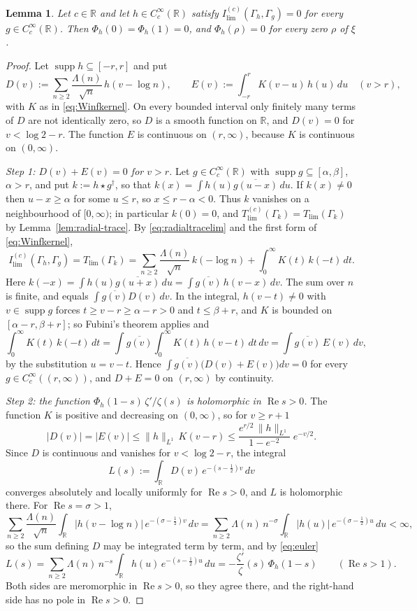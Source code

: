 \documentclass[11pt]{amsart}
\newtheorem{lemma}[theorem]{Lemma}
\theoremstyle{remark}
\numberwithin{equation}{section}
\newcommand{\R}{\mathbb R}
\newcommand{\Rel}{\operatorname{Re}}
\newcommand{\supp}{\operatorname{supp}}
\newcommand{\Tl}{T_{\lim}}
\begin{document}
\begin{lemma}
\label{lem:radicalnec}
Let $c\in\R$ and let $h\in C_c^\infty(\R)$ satisfy
$I^{(c)}_{\lim}(\Gamma_h,\Gamma_g)=0$ for every $g\in C_c^\infty(\R)$.  Then
$\Phi_h(0)=\Phi_h(1)=0$, and $\Phi_h(\rho)=0$ for every zero $\rho$ of $\xi$.
\end{lemma}

\begin{proof}
Let $\supp h\subseteq[-r,r]$ and put
\[
  D(v):=\sum_{n\ge2}\frac{\Lambda(n)}{\sqrt n}\,h(v-\log n),\qquad
  E(v):=\int_{-r}^{r}K(v-u)\,h(u)\,du\quad(v>r),
\]
with $K$ as in \eqref{eq:Winfkernel}.  On every bounded interval only
finitely many terms of $D$ are not identically zero, so $D$ is a smooth
function on $\R$, and $D(v)=0$ for $v<\log2-r$.  The function $E$ is
continuous on $(r,\infty)$, because $K$ is continuous on $(0,\infty)$.

\emph{Step 1: $D(v)+E(v)=0$ for $v>r$.}  Let $g\in C_c^\infty(\R)$ with
$\supp g\subseteq[\alpha,\beta]$, $\alpha>r$, and put $k:=h\star g^\dagger$,
so that $k(x)=\int h(u)\overline{g(u-x)}\,du$.  If $k(x)\ne0$ then
$u-x\ge\alpha$ for some $u\le r$, so $x\le r-\alpha<0$.  Thus $k$ vanishes on
a neighbourhood of $[0,\infty)$; in particular $k(0)=0$, and
$T^{(c)}_{\lim}(\Gamma_k)=\Tl(\Gamma_k)$ by Lemma~\ref{lem:radial-trace}.  By
\eqref{eq:radialtracelim} and the first form of \eqref{eq:Winfkernel},
\[
  I^{(c)}_{\lim}(\Gamma_h,\Gamma_g)=\Tl(\Gamma_k)
  =\sum_{n\ge2}\frac{\Lambda(n)}{\sqrt n}\,k(-\log n)
   +\int_0^\infty K(t)\,k(-t)\,dt .
\]
Here $k(-x)=\int h(u)\overline{g(u+x)}\,du
=\int\overline{g(v)}\,h(v-x)\,dv$.  The sum over $n$ is finite, and equals
$\int\overline{g(v)}D(v)\,dv$.  In the integral, $h(v-t)\ne0$ with
$v\in\supp g$ forces $t\ge v-r\ge\alpha-r>0$ and $t\le\beta+r$, and $K$ is
bounded on $[\alpha-r,\beta+r]$; so Fubini's theorem applies and
\[
  \int_0^\infty K(t)\,k(-t)\,dt
  =\int\overline{g(v)}\int_0^\infty K(t)\,h(v-t)\,dt\,dv
  =\int\overline{g(v)}\,E(v)\,dv ,
\]
by the substitution $u=v-t$.  Hence
$\int\overline{g(v)}\bigl(D(v)+E(v)\bigr)dv=0$ for every
$g\in C_c^\infty((r,\infty))$, and $D+E=0$ on $(r,\infty)$ by continuity.

\emph{Step 2: the function $\Phi_h(1-s)\,\zeta'/\zeta(s)$ is holomorphic in
$\Rel s>0$.}  The function $K$ is positive and decreasing on $(0,\infty)$,
so for $v\ge r+1$
\[
  |D(v)|=|E(v)|\le\|h\|_{L^1}\,K(v-r)
  \le\frac{e^{r/2}\,\|h\|_{L^1}}{1-e^{-2}}\;e^{-v/2}.
\]
Since $D$ is continuous and vanishes for $v<\log2-r$, the integral
\[
  L(s):=\int_\R D(v)\,e^{-(s-\frac12)v}\,dv
\]
converges absolutely and locally uniformly for $\Rel s>0$, and $L$ is
holomorphic there.  For $\Rel s=\sigma>1$,
\[
  \sum_{n\ge2}\frac{\Lambda(n)}{\sqrt n}\int_\R|h(v-\log n)|\,
  e^{-(\sigma-\frac12)v}\,dv
  =\sum_{n\ge2}\Lambda(n)\,n^{-\sigma}\int_\R|h(u)|\,e^{-(\sigma-\frac12)u}\,du
  <\infty ,
\]
so the sum defining $D$ may be integrated term by term, and by
\eqref{eq:euler}
\[
  L(s)=\sum_{n\ge2}\Lambda(n)\,n^{-s}\int_\R h(u)\,e^{-(s-\frac12)u}\,du
  =-\frac{\zeta'}{\zeta}(s)\,\Phi_h(1-s)\qquad(\Rel s>1).
\]
Both sides are meromorphic in $\Rel s>0$, so they agree there, and the
right-hand side has no pole in $\Rel s>0$.


\end{proof}
\end{document}
